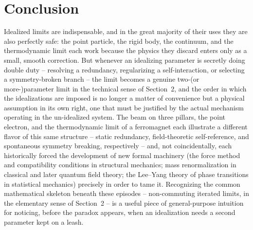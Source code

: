 \section{Conclusion}
\label{limits:conclusion}
Idealized limits are indispensable, and in the great majority of
their uses they are also perfectly safe: the point particle, the
rigid body, the continuum, and the thermodynamic limit each work
because the physics they discard enters only as a small, smooth
correction. But whenever an idealizing parameter is secretly
doing double duty -- resolving a redundancy, regularizing a
self-interaction, or selecting a symmetry-broken branch -- the
limit becomes a genuine two-(or more-)parameter limit in the
technical sense of Section~2, and the order in which the
idealizations are imposed is no longer a matter of convenience
but a physical assumption in its own right, one that must be
justified by the actual mechanism operating in the un-idealized
system. The beam on three pillars, the point electron, and the
thermodynamic limit of a ferromagnet each illustrate a different
flavor of this same structure -- static redundancy,
field-theoretic self-reference, and spontaneous symmetry
breaking, respectively -- and, not coincidentally, each
historically forced the development of new formal machinery (the
force method and compatibility conditions in structural
mechanics; mass renormalization in classical and later quantum
field theory; the Lee--Yang theory of phase transitions in
statistical mechanics) precisely in order to tame it.
Recognizing the common mathematical skeleton beneath these
episodes -- non-commuting iterated limits, in the elementary
sense of Section~2 -- is a useful piece of general-purpose
intuition for noticing, before the paradox appears, when an
idealization needs a second parameter kept on a leash.

